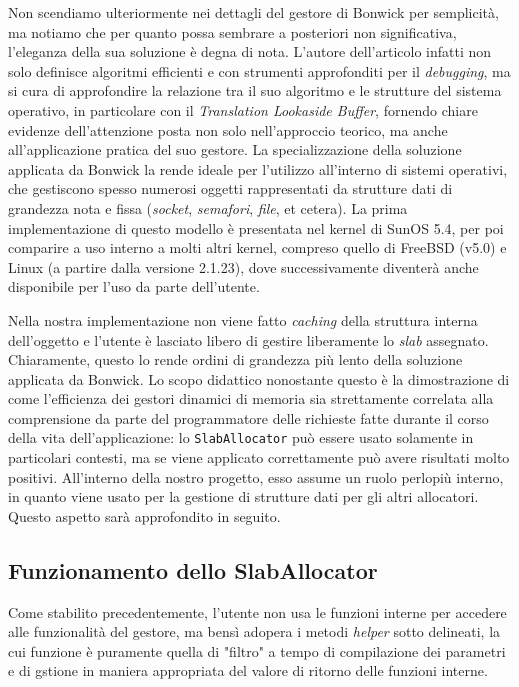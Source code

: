 Non scendiamo ulteriormente nei dettagli del gestore di Bonwick per semplicità, ma notiamo che per quanto possa sembrare a posteriori non significativa, l’eleganza della sua soluzione è degna di nota. L’autore dell’articolo infatti non solo definisce algoritmi efficienti e con strumenti approfonditi per il \textit{debugging}, ma si cura di approfondire la relazione tra il suo algoritmo e le strutture del sistema operativo, in particolare con il \textit{Translation Lookaside Buffer}, fornendo chiare evidenze dell’attenzione posta non solo nell’approccio teorico, ma anche all’applicazione pratica del suo gestore. La specializzazione della soluzione applicata da Bonwick la rende ideale per l’utilizzo all’interno di sistemi operativi, che gestiscono spesso numerosi oggetti rappresentati da strutture dati di grandezza nota e fissa (\textit{socket}, \textit{semafori}, \textit{file}, et cetera). La prima implementazione di questo modello è presentata nel kernel di SunOS 5.4, per poi comparire a uso interno a molti altri kernel, compreso quello di FreeBSD (v5.0) e Linux (a partire dalla versione 2.1.23), dove successivamente diventerà anche disponibile per l’uso da parte dell’utente.

Nella nostra implementazione non viene fatto \textit{caching} della struttura interna dell’oggetto e l’utente è lasciato libero di gestire liberamente lo \textit{slab} assegnato. Chiaramente, questo lo rende ordini di grandezza più lento della soluzione applicata da Bonwick. Lo scopo didattico nonostante questo è la dimostrazione di come l’efficienza dei gestori dinamici di memoria sia strettamente correlata alla comprensione da parte del programmatore delle richieste fatte durante il corso della vita dell’applicazione: lo \texttt{SlabAllocator} può essere usato solamente in particolari contesti, ma se viene applicato correttamente può avere risultati molto positivi. All'interno della nostro progetto, esso assume un ruolo perlopiù interno, in quanto viene usato per la gestione di strutture dati per gli altri allocatori. Questo aspetto sarà approfondito in seguito.

\subsection*{Funzionamento dello SlabAllocator}
Come stabilito precedentemente, l’utente non usa le funzioni interne per accedere alle funzionalità del gestore, ma bensì adopera i metodi \textit{helper} sotto delineati, la cui funzione è puramente quella di "filtro" a tempo di compilazione dei parametri e di gstione in maniera appropriata del valore di ritorno delle funzioni interne. 


